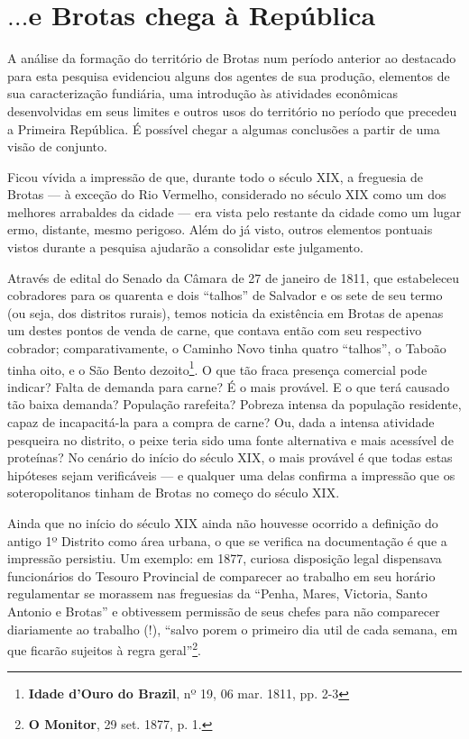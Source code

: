 \section{\(\dots\)e Brotas chega à República}\label{sec:conccap2}

A análise da formação do território de Brotas num período anterior ao destacado para esta pesquisa evidenciou alguns dos agentes de sua produção, elementos de sua caracterização fundiária, uma introdução às atividades econômicas desenvolvidas em seus limites e outros usos do território no período que precedeu a Primeira República. É possível chegar a algumas conclusões a partir de uma visão de conjunto.

Ficou vívida a impressão de que, durante todo o século XIX, a freguesia de Brotas --- à exceção do Rio Vermelho, considerado no século XIX como um dos melhores arrabaldes da cidade --- era vista pelo restante da cidade como um lugar ermo, distante, mesmo perigoso. Além do já visto, outros elementos pontuais vistos durante a pesquisa ajudarão a consolidar este julgamento.

Através de edital do Senado da Câmara de 27 de janeiro de 1811, que estabeleceu cobradores para os quarenta e dois ``talhos'' de Salvador e os sete de seu termo (ou seja, dos distritos rurais), temos noticia da existência em Brotas de apenas um destes pontos de venda de carne, que contava então com seu respectivo cobrador; comparativamente, o Caminho Novo tinha quatro ``talhos'', o Taboão tinha oito, e o São Bento dezoito\footnote{\textbf{Idade d'Ouro do Brazil}, nº 19, 06 mar. 1811, pp. 2-3}. O que tão fraca presença comercial pode indicar? Falta de demanda para carne? É o mais provável. E o que terá causado tão baixa demanda? População rarefeita? Pobreza intensa da população residente, capaz de incapacitá-la para a compra de carne? Ou, dada a intensa atividade pesqueira no distrito, o peixe teria sido uma fonte alternativa e mais acessível de proteínas? No cenário do início do século XIX, o mais provável é que todas estas hipóteses sejam verificáveis --- e qualquer uma delas confirma a impressão que os soteropolitanos tinham de Brotas no começo do século XIX.

Ainda que no início do século XIX ainda não houvesse ocorrido a definição do antigo 1º Distrito como área urbana, o que se verifica na documentação é que a impressão persistiu. Um exemplo: em 1877, curiosa disposição legal dispensava funcionários do Tesouro Provincial de comparecer ao trabalho em seu horário regulamentar se morassem nas freguesias da ``Penha, Mares, Victoria, Santo Antonio e Brotas'' e obtivessem permissão de seus chefes para não comparecer diariamente ao trabalho (!), ``salvo porem o primeiro dia util de cada semana, em que ficarão sujeitos à regra geral''\footnote{\textbf{O Monitor}, 29 set. 1877, p. 1.}. 

